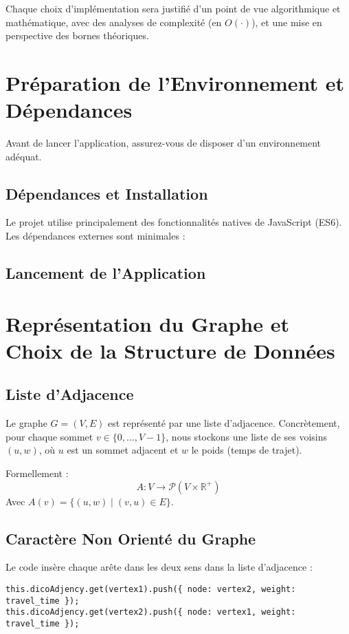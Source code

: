 \documentclass[a4paper,12pt]{article}
\begin{document}
Chaque choix d’implémentation sera justifié d’un point de vue algorithmique et mathématique, avec des analyses de complexité (en $O(\cdot)$), et une mise en perspective des bornes théoriques.


\section{Préparation de l'Environnement et Dépendances}

Avant de lancer l’application, assurez-vous de disposer d’un environnement adéquat.

\subsection{Dépendances et Installation}

Le projet utilise principalement des fonctionnalités natives de JavaScript (ES6). Les dépendances externes sont minimales :



\subsection{Lancement de l’Application}


\section{Représentation du Graphe et Choix de la Structure de Données}

\subsection{Liste d’Adjacence}

Le graphe $G=(V,E)$ est représenté par une liste d’adjacence. Concrètement, pour chaque sommet $v \in \{0,\dots,V-1\}$, nous stockons une liste de ses voisins $(u,w)$, où $u$ est un sommet adjacent et $w$ le poids (temps de trajet).

Formellement :
\[
A : V \to \mathcal{P}(V \times \mathbb{R}^+)
\]
Avec $A(v) = \{(u,w) \mid (v,u) \in E \}$.

\subsection{Caractère Non Orienté du Graphe}

Le code insère chaque arête dans les deux sens dans la liste d’adjacence :
\begin{verbatim}
this.dicoAdjency.get(vertex1).push({ node: vertex2, weight: travel_time });
this.dicoAdjency.get(vertex2).push({ node: vertex1, weight: travel_time });
\end{verbatim}
\end{document}

